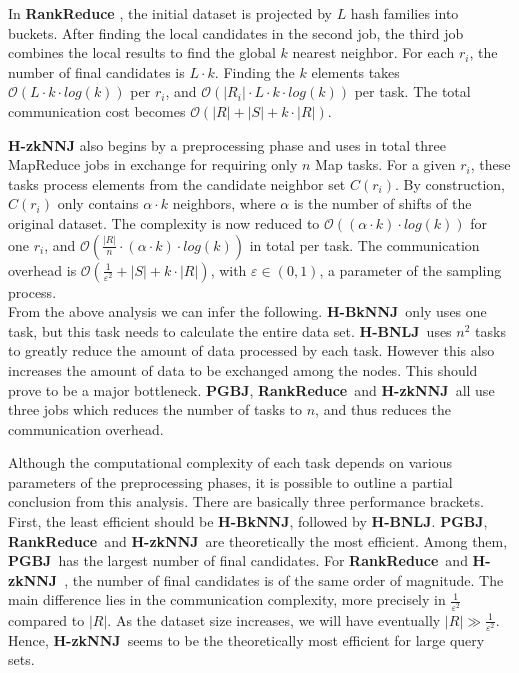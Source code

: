\documentclass[10pt,journal,compsoc]{IEEEtran}
\newcommand{\Z}{{\bf H-zkNNJ}}
\newcommand{\LSH}{{\bf RankReduce}}
\newcommand{\VO}{{\bf PGBJ}}
\newcommand{\HBNLJ}{{\bf H-BNLJ}}
\newcommand{\HBK}{{\bf H-BkNNJ}}
\begin{document}
In {\bf \LSH} \cite{Stupar10rankreduce-}, the initial dataset is projected by $L$ hash  families into 
buckets.
After finding the local candidates in the second job, the third job combines the local results to 
find the global $k$ nearest neighbor. For each $r_i$, the number of final candidates is $L\cdot k$. Finding the $k$ 
elements takes $\mathcal{O}(L \cdot k \cdot log(k))$ per $r_i$, and $\mathcal{O}(|R_i| \cdot L \cdot k \cdot log(k))$ 
per task. The total communication cost becomes $\mathcal{O}(|R|+|S|+k\cdot |R|)$.



{\bf \Z}\cite{Zhang:2012:EPK:2247596.2247602} also begins by a preprocessing phase and uses in total three MapReduce 
jobs in exchange for requiring only $n$ Map tasks. For a given $r_i$, these tasks 
process elements from the candidate neighbor set $C\left(r_i\right)$. By construction, $C\left(r_i\right)$ only 
contains  $\alpha \cdot k$ neighbors, where $\alpha$ is the number of shifts of the original dataset. The complexity is now reduced to $\mathcal{O}(\left(\alpha \cdot k\right) \cdot log\left(k\right))$ for one $r_i$, 
and $\mathcal{O}(\frac{\left|R\right|}{n} \cdot \left(\alpha \cdot k\right) \cdot log\left(k\right))$ in total 
per task. The communication overhead is 
$\mathcal{O}(\frac{1}{\varepsilon^2}+\left|S\right|+k \cdot \left|R\right|)$, with $\varepsilon \in (0,1)$, a parameter
of the sampling process. \\

From the above analysis we can infer the following. \HBK~only uses one task, but this task needs to calculate the 
entire data set. 
\HBNLJ~uses $n^2$ tasks to greatly reduce the amount of data processed by each task. However this also increases the 
amount of data to be exchanged among the nodes. This should prove to be a major bottleneck. 
\VO, \LSH~and \Z~all use three jobs which reduces the number of tasks to $n$, and thus reduces the communication 
overhead.

Although the computational complexity 
of each task depends on various parameters of the preprocessing phases, it is possible to outline a partial 
conclusion from this analysis. There are basically three performance brackets. First, the least efficient should be 
\HBK, followed by \HBNLJ. \VO, \LSH~and 
\Z~are theoretically the most efficient. Among them, \VO~has the largest number of final candidates. For \LSH~and
\Z~, the number of final candidates is of the same order of magnitude. The main difference lies in the communication
complexity, more precisely in $\frac{1}{\varepsilon^2}$ compared to $\left|R\right|$. As the dataset size increases,
we will have eventually  $\left|R\right| \gg \frac{1}{\varepsilon^2}$. Hence, \Z~seems to be the theoretically most
efficient for large query sets.
\end{document}
